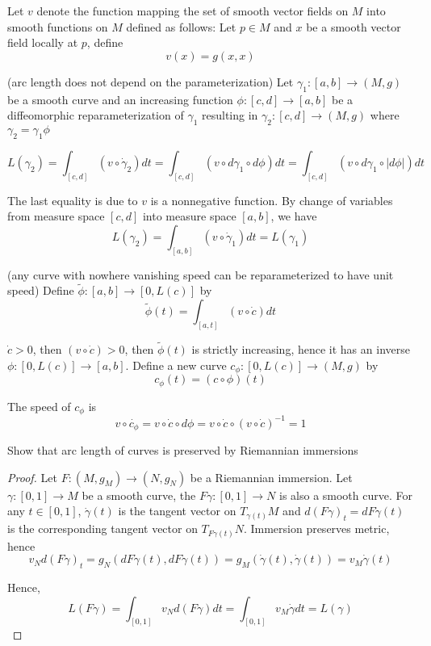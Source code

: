 \begin{longproof}
	Let $v$ denote the function mapping the set of smooth vector fields on $M$ into smooth functions on $M$ defined as follows: Let $p \in M$ and $x$ be a smooth vector field locally at $p$, define
	$$
		v(x) = g(x, x)
	$$
	
	(arc length does not depend on the parameterization) Let $\gamma_1: [a, b] \to (M, g)$ be a smooth curve and an increasing function $\phi: [c, d] \to [a, b]$ be a diffeomorphic reparameterization of $\gamma_1$ resulting in $\gamma_2: [c, d] \to (M, g)$ where $\gamma_2 = \gamma_1 \phi$
	
	$$
		L(\gamma_2) = \int_{[c, d]} (v \circ \dot{\gamma}_2) dt = \int_{[c, d]} (v \circ d \gamma_1 \circ d \phi) dt = \int_{[c, d]} (v \circ d \gamma_1 \circ |d \phi|) dt
	$$
	
	The last equality is due to $v$ is a nonnegative function. By change of variables from measure space $[c, d]$ into measure space $[a, b]$, we have
	$$
		L(\gamma_2)= \int_{[a, b]} (v \circ \dot{\gamma}_1) dt = L(\gamma_1)
	$$
	
	
	(any curve with nowhere vanishing speed can be reparameterized to have unit speed)
	Define $\tilde{\phi}: [a, b] \to [0, L(c)]$ by
	$$
		\tilde{\phi}(t) = \int_{[a, t]} (v \circ \dot{c}) dt
	$$
	
	$\dot{c} > 0$, then $(v \circ \dot{c}) > 0$, then $\tilde{\phi}(t)$ is strictly increasing, hence it has an inverse $\phi: [0, L(c)] \to [a, b]$. Define a new curve $c_\phi: [0, L(c)] \to (M, g)$ by
	$$
		c_\phi(t) = (c \circ \phi)(t)
	$$
	
	The speed of $c_\phi$ is
	$$
		v \circ \dot{c_\phi} = v \circ \dot{c} \circ d \phi = v \circ \dot{c} \circ (v \circ \dot{c})^{-1} = 1
	$$ 
\end{longproof}

\begin{problem}
	Show that arc length of curves is preserved by Riemannian immersions
\end{problem}

\begin{proof}
	Let $F: (M, g_M) \to (N, g_N)$ be a Riemannian immersion. Let $\gamma: [0, 1] \to M$ be a smooth curve, the $F \gamma: [0, 1] \to N$ is also a smooth curve. For any $t \in [0, 1]$, $\dot{\gamma}(t)$ is the tangent vector on $T_{\gamma(t)} M$ and $d(F \gamma)_t = dF \dot{\gamma}(t)$ is the corresponding tangent vector on $T_{F\gamma(t)} N$. Immersion preserves metric, hence
	$$
		v_N d(F \gamma)_t = g_N(dF \dot{\gamma}(t), dF \dot{\gamma}(t)) = g_M(\dot{\gamma}(t), \dot{\gamma}(t)) = v_M \dot{\gamma}(t)
	$$
	
	Hence, 
	$$
		L(F \gamma) = \int_{[0, 1]} v_N d(F \gamma) dt = \int_{[0, 1]} v_M \dot{\gamma} dt = L(\gamma)
	$$	
\end{proof}

